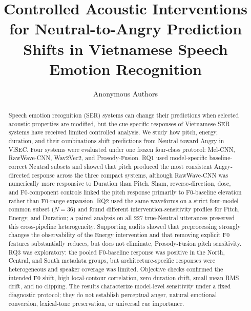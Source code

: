 \documentclass[a4paper,runningheads]{llncs}
\begin{document}
\title{Controlled Acoustic Interventions for Neutral-to-Angry Prediction Shifts in Vietnamese Speech Emotion Recognition}

\author{Anonymous Authors}

\maketitle

\begin{abstract}
Speech emotion recognition (SER) systems can change their predictions when selected acoustic properties are modified, but the cue-specific responses of Vietnamese SER systems have received limited controlled analysis. We study how pitch, energy, duration, and their combinations shift predictions from Neutral toward Angry in ViSEC. Four systems were evaluated under one frozen four-class protocol: Mel-CNN, RawWave-CNN, Wav2Vec2, and Prosody-Fusion. RQ1 used model-specific baseline-correct Neutral subsets and showed that pitch produced the most consistent Angry-directed response across the three compact systems, although RawWave-CNN was numerically more responsive to Duration than Pitch. Sham, reverse-direction, dose, and F0-component controls linked the pitch response primarily to F0-baseline elevation rather than F0-range expansion. RQ2 used the same waveforms on a strict four-model common subset ($N=36$) and found different intervention-sensitivity profiles for Pitch, Energy, and Duration; a paired analysis on all 227 true-Neutral utterances preserved this cross-pipeline heterogeneity. Supporting audits showed that preprocessing strongly changes the observability of the Energy intervention and that removing explicit F0 features substantially reduces, but does not eliminate, Prosody-Fusion pitch sensitivity. RQ3 was exploratory: the pooled F0-baseline response was positive in the North, Central, and South metadata groups, but architecture-specific responses were heterogeneous and speaker coverage was limited. Objective checks confirmed the intended F0 shift, high local-contour correlation, zero duration drift, small mean RMS drift, and no clipping. The results characterize model-level sensitivity under a fixed diagnostic protocol; they do not establish perceptual anger, natural emotional conversion, lexical-tone preservation, or universal cue importance.

\end{abstract}
\end{document}
